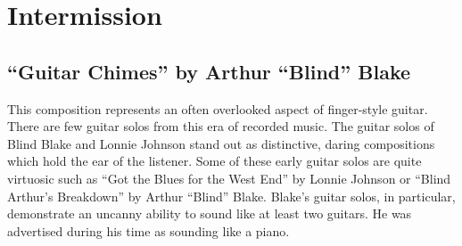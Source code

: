 \documentclass{tufte-handout}
\begin{document}
\section*{Intermission}







\subsection*{``Guitar Chimes'' by Arthur ``Blind'' Blake}
This composition represents an often overlooked aspect of finger-style
guitar. There are few guitar solos from this era of recorded music. The guitar
solos of Blind Blake and Lonnie Johnson stand out as distinctive, daring
compositions which hold the ear of the listener. Some of these early guitar
solos are quite virtuosic such as ``Got the Blues for the West End'' by Lonnie
Johnson or ``Blind Arthur's Breakdown'' by Arthur ``Blind'' Blake. Blake's
guitar solos, in particular, demonstrate an uncanny ability to sound like at
least two guitars. He was advertised during his time as sounding like a piano.
\end{document}
